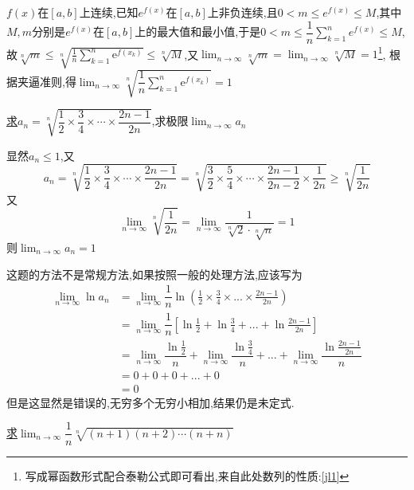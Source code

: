\documentclass[8pt a4paper, oneside, UTF8]{ctexbook}
\begin{document}
\begin{sloppypar}
\begin{problem}
    \end{problem}
    \begin{solution}
        $f(x)$在$[a,b]$上连续,已知$e^{f(x)}$在$[a,b]$上非负连续,且$0<m \leqslant e^{f(x)} \leqslant M$,其中$M,m$分别是$e^{f(x)}$在$[a,b]$上的最大值和最小值,于是$0<m\leqslant \dfrac{1}{n} \sum_{k=1}^{n}e^{f(x)} \leqslant M$,故$\sqrt[n]{m}\leqslant\sqrt[n]{\frac1n\sum_{k=1}^n\mathrm{e}^{f(x_k)}}\leqslant\sqrt[n]{M}$,又$\lim_{n\to\infty}\sqrt[n]{m}=\lim_{n\to\infty}\sqrt[n]{M}=1$\footnote{写成幂函数形式配合泰勒公式即可看出,来自此处数列的性质:\ref{jl1}}, 根据夹逼准则,得$\lim_{n\to\infty}\sqrt[n]{\dfrac1n\sum_{k=1}^n\mathrm{e}^{f(x_k)}}=1$ 
    \end{solution}
    \begin{problem}
       \uline{求}$a_n=\sqrt[n]{\dfrac12\times\dfrac34\times\cdots\times\dfrac{2n-1}{2n}}$,求极限$\lim_{n \to \infty}a_n$
    \end{problem}
    \begin{solution}
        显然$a_n \leqslant 1$,又
        $$
            a_n=\sqrt[n]{\dfrac12\times\dfrac34\times\cdots\times\dfrac{2n-1}{2n}}=\sqrt[n]{\dfrac32\times\dfrac54\times\cdots\times\dfrac{2n-1}{2n-2}\times\dfrac1{2n}}\geqslant\sqrt[n]{\dfrac1{2n}}
        $$
        又
        $$
            \lim_{n\to\infty}\sqrt[n]{\dfrac1{2n}}=\lim_{n\to\infty}\dfrac1{\sqrt[n]{2}\cdot\sqrt[n]{n}}=1
        $$
        则$\lim_{n\to\infty}a_n=1$
    \end{solution}
    \begin{note}
        这题的方法不是常规方法,如果按照一般的处理方法,应该写为
        \begin{align*}
            \lim_{n \to \infty}\ln a_n & =\lim_{n \to \infty}\dfrac{1}{n}\ln(\frac{1}{2}\times \frac{3}{4} \times ... \times \frac{2n-1}{2n})\\
            & = \lim_{n \to \infty} \dfrac{1}{n}[\ln \frac{1}{2}+\ln \frac{3}{4}+...+\ln \frac{2n-1}{2n}]\\
            & = \lim_{n \to \infty}\dfrac{\ln \frac{1}{2}}{n}+\lim_{n \to \infty}\dfrac{\ln \frac{3}{4}}{n}+...+\lim_{n \to \infty}\dfrac{\ln \frac{2n-1}{2n}}{n}\\
            & = 0+0+0+...+0\\
            &=0
        \end{align*}
        但是这显然是错误的,无穷多个无穷小相加,结果仍是未定式.
    \end{note}
    \begin{problem}
        \uline{求}$\lim_{n\to\infty}\dfrac{1}{n}\sqrt[n]{(n+1)(n+2)\cdots(n+n)}$

\end{problem}
\end{sloppypar}
\end{document}
